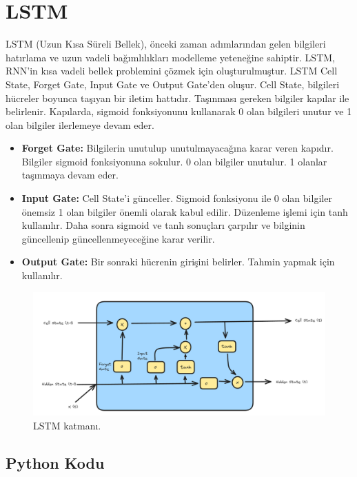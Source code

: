 \section{LSTM}
LSTM (Uzun Kısa Süreli Bellek), önceki zaman adımlarından gelen bilgileri hatırlama ve uzun vadeli bağımlılıkları modelleme yeteneğine sahiptir. LSTM, RNN'in kısa vadeli bellek problemini çözmek için oluşturulmuştur. LSTM Cell State, Forget Gate, Input Gate ve Output Gate'den oluşur. Cell State, bilgileri hücreler boyunca taşıyan bir iletim hattıdır. Taşınması gereken bilgiler kapılar ile belirlenir. Kapılarda, sigmoid fonksiyonunu kullanarak 0 olan bilgileri unutur ve 1 olan bilgiler ilerlemeye devam eder.

\begin{itemize}
    \item \textbf{Forget Gate:} Bilgilerin unutulup unutulmayacağına karar veren kapıdır. Bilgiler sigmoid fonksiyonuna sokulur. 0 olan bilgiler unutulur. 1 olanlar taşınmaya devam eder.
    \item \textbf{Input Gate:} Cell State'i günceller. Sigmoid fonksiyonu ile 0 olan bilgiler önemsiz 1 olan bilgiler önemli olarak kabul edilir. Düzenleme işlemi için tanh kullanılır. Daha sonra sigmoid ve tanh sonuçları çarpılır ve bilginin güncellenip güncellenmeyeceğine karar verilir.
    \item \textbf{Output Gate:} Bir sonraki hücrenin girişini belirler. Tahmin yapmak için kullanılır.
\end{itemize}

\begin{figure}[h]
    \centering
    \includegraphics[width=1\textwidth]{images/LSTM_layer.png}
    \caption{LSTM katmanı.}
    \label{fig:enter-label}
\end{figure}

\subsection{Python Kodu}

